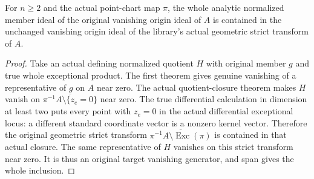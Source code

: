 \begin{theorem}
\label{hir:actual-point-geometric-strict-normalized-inclusion}
\leanok
For $n\ge2$ and the actual point-chart map $\pi$, the whole analytic
normalized member ideal of the original vanishing origin ideal of $A$
is contained in the unchanged vanishing origin ideal of the library's
actual geometric strict transform of $A$.
\end{theorem}
\begin{proof}
Take an actual defining normalized quotient $H$ with original member $g$
and true whole exceptional product. The first theorem gives genuine
vanishing of a representative of $g$ on $A$ near zero. The actual
quotient-closure theorem makes $H$ vanish on
$\overline{\pi^{-1}A\setminus\{z_e=0\}}$ near zero.
The true differential calculation in dimension at least two puts every
point with $z_e=0$ in the actual differential exceptional locus: a
different standard coordinate vector is a nonzero kernel vector.
Therefore the original geometric strict transform
$\overline{\pi^{-1}A\setminus\operatorname{Exc}(\pi)}$ is contained
in that actual closure. The same representative of $H$ vanishes on
this strict transform near zero. It is thus an original target vanishing
generator, and span gives the whole inclusion.
\end{proof}

